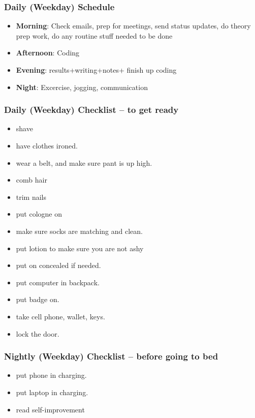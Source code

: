 \begin{frame} 
\frametitle{Daily (Weekday) Schedule}
\begin{itemize} 
\item \textbf{Morning}: Check emails, prep for meetings, send status updates, 
do theory prep work, do any routine stuff needed to be done 
\item \textbf{Afternoon}: Coding 
\item \textbf{Evening}: results+writing+notes+  finish up coding  
\item \textbf{Night}: Excercise, jogging, communication 
\end{itemize} 
\end{frame}



\begin{frame} 
\frametitle{Daily (Weekday) Checklist -- to get ready} 
\begin{itemize} 
\item \tiny shave \\
\item \tiny have clothes ironed. \\
\item \tiny wear a belt, and make sure pant is up high. \\
\item \tiny comb hair \\
\item \tiny trim nails \\
\item \tiny put cologne on \\
\item \tiny make sure socks are matching and clean. \\
\item \tiny put lotion to make sure you are not ashy \\ 
\item \tiny  put on concealed if needed. \\
\item \tiny put computer in backpack.
\item \tiny put badge on. 
\item \tiny take cell phone, wallet, keys.
\item \tiny lock the door. \\
\end{itemize} 
\end{frame}

\begin{frame} 
\frametitle{Nightly (Weekday) Checklist -- before going to bed} 
\begin{itemize} 
\item \small put phone in charging.
\item \small put laptop in charging. 
\item \small read self-improvement
\end{itemize} 
\end{frame}

